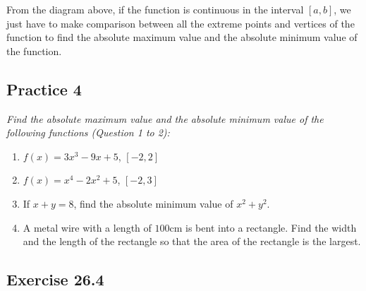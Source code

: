 \documentclass{report}
\begin{document}
From the diagram above, if the function is continuous in the interval $[a, b]$,
we just have to make comparison between all the extreme points and vertices of
the function to find the absolute maximum value and the absolute minimum value
of the function.

\subsection{Practice 4}

\noindent \hspace{1.2em}\textit{Find the absolute maximum value and the absolute minimum value of the following functions (Question 1 to 2):}
\begin{enumerate}
    \item $f(x) = 3x^3 - 9x + 5$, $[-2, 2]$
    \item $f(x) = x^4 - 2x^2 + 5$, $[-2, 3]$
    \item If $x + y = 8$, find the absolute minimum value of $x^2 + y^2$.
    \item A metal wire with a length of $100$cm is bent into a rectangle. Find the width
          and the length of the rectangle so that the area of the rectangle is the
          largest.
\end{enumerate}

\subsection{Exercise 26.4}
\end{document}
